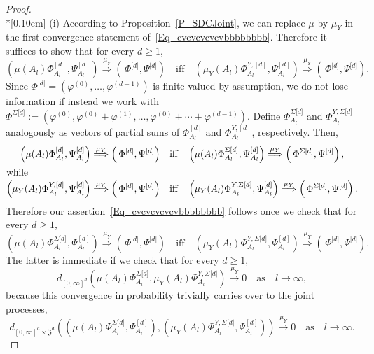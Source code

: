 \documentclass[AHL,Unicode,longabstracts]{cedram}
\newcommand{\frkZ}{\mathfrak{Z}}
\begin{document}
\begin{proof}\ \\*[0.10em]
\noindent(i) According to Proposition~\ref{P_SDCJoint}, we can replace $\mu$ by $\mu_{Y}$ in the first convergence statement of~\eqref{Eq_cvcvcvcvcvbbbbbbbb}. Therefore it suffices to show that for every $d\geq1$,
\[
\left(\mu(A_{l})\Phi_{A_{l}}^{[d]},\Psi_{A_{l}}^{[d]}\right)\overset{\mu_{Y} }{\Longrightarrow}\left(\,\Phi^{\lbrack d]},\Psi^{\lbrack d]}\right)\quad\text{iff}\quad \left(\mu_{Y}(A_{l})\Phi_{A_{l}}^{Y,[d]},\Psi_{A_{l}}^{[d]}\right)\overset{\mu_{Y} }{\Longrightarrow}\left(\,\Phi^{\lbrack d]},\Psi^{\lbrack d]}\right).
\]
Since $\Phi^{\lbrack d]}=(\varphi^{(0)},\ldots,\varphi^{(d-1)})$ is finite-valued by assumption, we do not lose information if instead we work with $\Phi^{\Sigma\lbrack d]}:=(\varphi^{(0)},\varphi^{(0)}+\varphi ^{(1)},\ldots,\varphi^{(0)}+\cdots+\varphi^{(d-1)})$. Define $\Phi_{A_{l} }^{\Sigma\lbrack d]}$ and $\Phi_{A_{l}}^{Y,\Sigma\lbrack d]}$ analogously as vectors of partial sums of $\Phi_{A_{l}}^{[d]}$ and $\Phi_{A_{l}}^{Y,[d]}$, respectively. Then,
\begin{align*}
\left(\mu(A_{l})\Phi_{A_{l}}^{[d]},\Psi_{A_{l}}^{[d]}\right)\overset{\mu_{Y} }{\Longrightarrow}\left(\,\Phi^{\lbrack d]},\Psi^{\lbrack d]}\right)\quad &\text{iff}\quad \left(\mu(A_{l})\Phi_{A_{l}}^{\Sigma\lbrack d]},\Psi_{A_{l}}^{[d]}\right)\overset {\mu_{Y}}{\Longrightarrow}\left(\,\Phi^{\Sigma\lbrack d]},\Psi^{\lbrack d]}\right),
\\
\intertext{while}
\left(\mu_{Y}(A_{l})\Phi_{A_{l}}^{Y,[d]},\Psi_{A_{l}}^{[d]}\right)\overset{\mu_{Y} }{\Longrightarrow}\left(\,\Phi^{\lbrack d]},\Psi^{\lbrack d]}\right)\quad &\text{iff}\quad\left(\mu_{Y}(A_{l})\Phi_{A_{l}}^{Y,\Sigma\lbrack d]},\Psi_{A_{l}}^{[d]}\right)\overset{\mu_{Y}}{\Longrightarrow}\left(\,\Phi^{\Sigma\lbrack d]},\Psi^{\lbrack d]}\right).
\end{align*}
Therefore our assertion~\eqref{Eq_cvcvcvcvcvbbbbbbbb} follows once we check that for every $d\geq1$,
\[
\left(\mu(A_{l})\Phi_{A_{l}}^{\Sigma\lbrack d]},\Psi_{A_{l}}^{[d]}\right)\overset{\mu _{Y}}{\Longrightarrow}\left(\,\Phi^{\lbrack d]},\Psi^{\lbrack d]}\right)\quad\text{iff}\quad \left(\mu_{Y}(A_{l})\Phi_{A_{l}}^{Y,\Sigma\lbrack d]},\Psi_{A_{l}}^{[d]}\right)\overset{\mu_{Y}}{\Longrightarrow}\left(\,\Phi^{\lbrack d]},\Psi^{\lbrack d]}\right).
\]
The latter is immediate if we check that for every $d\geq1$,
\begin{equation}\label{Eq_hshshashhshdshhadh}
d_{[0,\infty]^{d}}\left(\mu(A_{l})\Phi_{A_{l}}^{\Sigma\lbrack d]},\mu _{Y}(A_{l})\Phi_{A_{l}}^{Y,\Sigma\lbrack d]}\right) \overset{\mu_{Y} }{\longrightarrow}0 \quad \text{as} \quad l\rightarrow\infty,
\end{equation}
because this convergence in probability trivially carries over to the joint processes,
\[
d_{[0,\infty]^{d}\times\frkZ^{d}}\left(\left(\mu(A_{l})\Phi_{A_{l} }^{\Sigma\lbrack d]},\Psi_{A_{l}}^{[d]}\right),\left(\mu_{Y}(A_{l})\Phi_{A_{l}} ^{Y,\Sigma\lbrack d]},\Psi_{A_{l}}^{[d]}\right)\right) \overset{\mu_{Y} }{\longrightarrow}0\quad\text{as}\quad l\rightarrow\infty.
\]
\vspace{6pt}


\end{proof}
\end{document}
